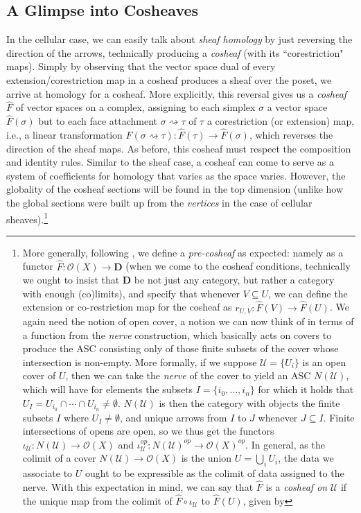 \documentclass[a4paper]{book}
\theoremstyle{definition}
\theoremstyle{definition}
\theoremstyle{definition}
\theoremstyle{theorem}
\theoremstyle{definition}
\begin{document}
\subsection{A Glimpse into Cosheaves}
In the cellular case, we can easily talk about \textit{sheaf homology} by just reversing the direction of the arrows, technically producing a \textit{cosheaf} (with its ``corestriction" maps). Simply by observing that the vector space dual of every extension/corestriction map in a cosheaf produces a sheaf over the poset, we arrive at homology for a cosheaf. More explicitly, this reversal gives us a \textit{cosheaf} $\hat{F}$ of vector spaces on a complex, assigning to each simplex $\sigma$ a vector space $\hat{F}(\sigma)$ but to each face attachment $\sigma \rightsquigarrow \tau$ of $\tau$ a corestriction (or extension) map, i.e., a linear transformation $\hat{F}(\sigma \rightsquigarrow \tau): \hat{F}(\tau) \rightarrow \hat{F}(\sigma)$, which reverses the direction of the sheaf maps. As before, this cosheaf must respect the composition and identity rules. Similar to the sheaf case, a cosheaf can come to serve as a system of coefficients for homology that varies as the space varies. However, the globality of the cosheaf sections will be found in the top dimension (unlike how the global sections were built up from the \textit{vertices} in the case of cellular sheaves).\footnote{More generally, following \cite{curry_sheaves_2013}, we define a \textit{pre-cosheaf} as expected: namely as a functor $\hat{F}: \mathscr{O}(X) \rightarrow \textbf{D}$ (when we come to the cosheaf conditions, technically we ought to insist that $\textbf{D}$ be not just any category, but rather a category with enough (co)limits), and specify that whenever $V \subseteq U$, we can define the extension or co-restriction map for the cosheaf as $r_{U,V}: \hat{F}(V) \rightarrow \hat{F}(U)$. We again need the notion of open cover, a notion we can now think of in terms of a function from the \textit{nerve} construction, which basically acts on covers to produce the ASC consisting only of those finite subsets of the cover whose intersection is non-empty. More formally, if we suppose $\mathscr{U} = \{U_i\}$ is an open cover of $U$, then we can take the \textit{nerve} of the cover to yield an ASC $N(\mathscr{U})$, which will have for elements the subsets $I = \{i_0, \dots, i_n \}$ for which it holds that $U_I = U_{i_0} \cap \cdots \cap U_{i_n} \neq \emptyset$. $N(\mathscr{U})$ is then the category with objects the finite subsets $I$ where $U_I \neq \emptyset$, and unique arrows from $I$ to $J$ whenever $J \subseteq  I$. Finite intersections of opens are open, so we thus get the functors $\iota_{\mathscr{U}}: N(\mathscr{U}) \rightarrow \mathscr{O}(X)$ and $\iota_{\mathscr{U}}^{op}: N(\mathscr{U})^{op} \rightarrow \mathscr{O}(X)^{op}$. In general, as the colimit of a cover $N(\mathscr{U}) \rightarrow \mathscr{O}(X)$ is the union $U = \bigcup_i U_i$, the data we associate to $U$ ought to be expressible as the colimit of data assigned to the nerve. With this expectation in mind, we can say that $\hat{F}$ is a \textit{cosheaf on} $\mathscr{U}$ if the unique map from the colimit of $\hat{F} \circ \iota_{\mathscr{U}}$ to $\hat{F}(U)$, given by 
}
\end{document}
